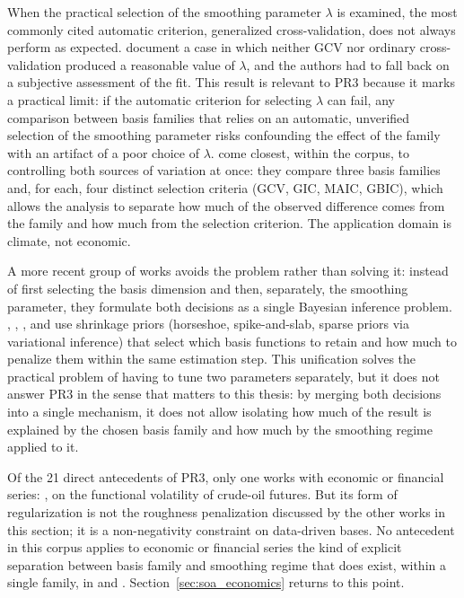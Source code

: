 When the practical selection of the smoothing parameter $\lambda$ is
examined, the most commonly cited automatic criterion, generalized
cross-validation, does not always perform as expected.
\cite{zin_smoothing_2020} document a case in which neither GCV nor
ordinary cross-validation produced a reasonable value of $\lambda$, and
the authors had to fall back on a subjective assessment of the fit. This
result is relevant to PR3 because it marks a practical limit: if the
automatic criterion for selecting $\lambda$ can fail, any comparison
between basis families that relies on an automatic, unverified selection
of the smoothing parameter risks confounding the effect of the family
with an artifact of a poor choice of $\lambda$.
\cite{beyaztas_comparison_2022} come closest, within the corpus, to
controlling both sources of variation at once: they compare three basis
families and, for each, four distinct selection criteria (GCV, GIC,
MAIC, GBIC), which allows the analysis to separate how much of the
observed difference comes from the family and how much from the
selection criterion. The application domain is climate, not economic.

A more recent group of works avoids the problem rather than solving it:
instead of first selecting the basis dimension and then, separately, the
smoothing parameter, they formulate both decisions as a single Bayesian
inference problem. \cite{sousa_bayesian_2024},
\cite{wakayama_horseshoe_2024}, \cite{dacruz_fast_2026}, and
\cite{tao_integrated_2025} use shrinkage priors (horseshoe,
spike-and-slab, sparse priors via variational inference) that select
which basis functions to retain and how much to penalize them within the
same estimation step. This unification solves the practical problem of
having to tune two parameters separately, but it does not answer PR3 in
the sense that matters to this thesis: by merging both decisions into a
single mechanism, it does not allow isolating how much of the result is
explained by the chosen basis family and how much by the smoothing
regime applied to it.

Of the 21 direct antecedents of PR3, only one works with economic or
financial series: \cite{rice_exploring_2023}, on the functional
volatility of crude-oil futures. But its form of regularization is not
the roughness penalization discussed by the other works in this section;
it is a non-negativity constraint on data-driven bases. No antecedent in
this corpus applies to economic or financial series the kind of explicit
separation between basis family and smoothing regime that does exist,
within a single family, in \cite{aguilera_comparative_2013} and
\cite{gao_factor_2024}. Section~\ref{sec:soa_economics} returns to this
point.

